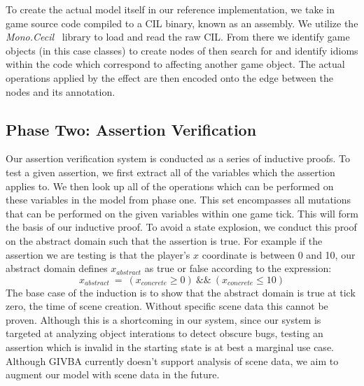 \documentclass[letterpaper,twocolumn,10pt]{article}
\begin{document}
To create the actual model itself in our reference implementation, we take in game source code compiled to a CIL binary, known as an assembly. We utilize the \textit{Mono.Cecil}~\cite{Mono.Cecil} library to load and read the raw CIL. From there we identify game objects (in this case classes) to create nodes of then search for and identify idioms within the code which correspond to affecting another game object. The actual operations applied by the effect are then encoded onto the edge between the nodes and its annotation. \\

\subsection{Phase Two: Assertion Verification}

Our assertion verification system is conducted as a series of inductive proofs. To test a given assertion, we first extract all of the variables which the assertion applies to. We then look up all of the operations which can be performed on these variables in the model from phase one. This set encompasses all mutations that can be performed on the given variables within one game tick. This will form the basis of our inductive proof. To avoid a state explosion, we conduct this proof on the abstract domain such that the assertion is true. For example if the assertion we are testing is that the player's $x$ coordinate is between 0 and 10, our abstract domain defines $x_{abstract}$ as true or false according to the expression:
\begin{displaymath}x_{abstract}~=~(x_{concrete}\geq0)~\&\&~(x_{concrete}\leq10)
\end{displaymath}
The base case of the induction is to show that the abstract domain is true at tick zero, the time of scene creation. Without specific scene data this cannot be proven. Although this is a shortcoming in our system, since our system is targeted at analyzing object interations to detect obscure bugs, testing an assertion which is invalid in the starting state is at best a marginal use case. Although GIVBA currently doesn't support analysis of scene data, we aim to augment our model with scene data in the future. \\
\end{document}
